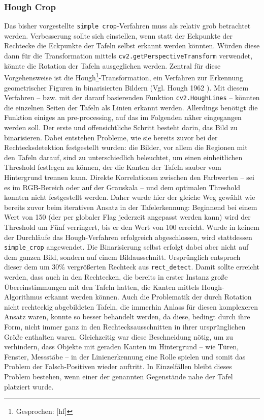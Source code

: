 \subsubsection*{Hough Crop}

Das bisher vorgestellte \verb|simple crop|-Verfahren muss als relativ grob betrachtet werden. Verbesserung sollte sich einstellen, wenn statt der Eckpunkte der Rechtecke die Eckpunkte der Tafeln selbst erkannt werden könnten. Würden diese dann für die Transformation mittels \verb|cv2.getPerspectiveTransform| verwendet, könnte die Rotation der Tafeln ausgeglichen werden.
Zentral für diese Vorgehensweise ist die Hough\footnote{Gesprochen: [h\textturnv{}f]}-Transformation, ein Verfahren zur Erkennung geometrischer Figuren in binarisierten Bildern (Vgl. Hough 1962 \cite{houghpatent}). Mit diesem Verfahren -- bzw. mit der darauf basierenden Funktion \verb|cv2.HoughLines| -- könnten die einzelnen Seiten der Tafeln als Linien erkannt werden. Allerdings benötigt die Funktion einiges an pre-processing, auf das im Folgenden näher eingegangen werden soll.
Der erste und offensichtliche Schritt besteht darin, das Bild zu binarisieren. Dabei entstehen Probleme, wie sie bereits zuvor bei der Rechtecksdetektion festgestellt wurden: die Bilder, vor allem die Regionen mit den Tafeln darauf, sind zu unterschiedlich beleuchtet, um einen einheitlichen Threshold festlegen zu können, der die Kanten der Tafeln sauber vom Hintergrund trennen kann. Direkte Korrelationen zwischen den Farbwerten -- sei es im RGB-Bereich oder auf der Grauskala -- und dem optimalen Threshold konnten nicht festgestellt werden. Daher wurde hier der gleiche Weg gewählt wie bereits zuvor beim iterativen Ansatz in der Tafelerkennung: Beginnend bei einem Wert von 150 (der per globaler Flag jederzeit angepasst werden kann) wird der Threshold um Fünf verringert, bis er den Wert von 100 erreicht. Wurde in keinem der Durchläufe das Hough-Verfahren erfolgreich abgeschlossen, wird stattdessen \verb|simple_crop| angewendet.
Die Binarisierung selbst erfolgt dabei aber nicht auf dem ganzen Bild, sondern auf einem Bildausschnitt. Ursprünglich entsprach dieser dem um 30\% vergrößerten Rechteck aus \verb|rect_detect|. Damit sollte erreicht werden, dass auch in den Rechtecken, die bereits in erster Instanz große Übereinstimmungen mit den Tafeln hatten, die Kanten mittels Hough-Algorithmus erkannt werden können. Auch die Problematik der durch Rotation nicht rechteckig abgebildeten Tafeln, die immerhin Anlass für diesen komplexeren Ansatz waren, konnte so besser behandelt werden, da diese, bedingt durch ihre Form, nicht immer ganz in den Rechtecksausschnitten in ihrer ursprünglichen Größe enthalten waren. Gleichzeitig war diese Beschneidung nötig, um zu verhindern, dass Objekte mit geraden Kanten im Hintergrund -- wie Türen, Fenster, Messstäbe -- in der Linienerkennung eine Rolle spielen und somit das Problem der Falsch-Positiven wieder auftritt. In Einzelfällen bleibt dieses Problem bestehen, wenn einer der genannten Gegenstände nahe der Tafel platziert wurde.

